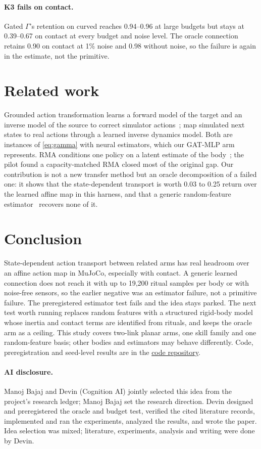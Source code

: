 \documentclass[11pt]{article}
\begin{document}
\paragraph{K3 fails on contact.}
Gated \(\Gamma\)'s retention on curved reaches 0.94--0.96 at large budgets but stays at 0.39--0.67 on contact at every budget and noise level. The oracle connection retains 0.90 on contact at 1\% noise and 0.98 without noise, so the failure is again in the estimate, not the primitive.

\section{Related work}
\label{sec:related}
Grounded action transformation learns a forward model of the target and an inverse model of the source to correct simulator actions~\citep{hanna2017gat}; \citet{christiano2016transfer} map simulated next states to real actions through a learned inverse dynamics model. Both are instances of \cref{eq:gamma} with neural estimators, which our GAT-MLP arm represents. RMA conditions one policy on a latent estimate of the body~\citep{kumar2021rma}; the pilot found a capacity-matched RMA closed most of the original gap. Our contribution is not a new transfer method but an oracle decomposition of a failed one: it shows that the state-dependent transport is worth 0.03 to 0.25 return over the learned affine map in this harness, and that a generic random-feature estimator~\citep{rahimi2007random} recovers none of it.

\section{Conclusion}
\label{sec:conclusion}
State-dependent action transport between related arms has real headroom over an affine action map in MuJoCo, especially with contact. A generic learned connection does not reach it with up to 19{,}200 ritual samples per body or with noise-free sensors, so the earlier negative was an estimator failure, not a primitive failure. The preregistered estimator test fails and the idea stays parked. The next test worth running replaces random features with a structured rigid-body model whose inertia and contact terms are identified from rituals, and keeps the oracle arm as a ceiling. This study covers two-link planar arms, one skill family and one random-feature basis; other bodies and estimators may behave differently. Code, preregistration and seed-level results are in the \href{https://github.com/manojbajaj95/cl/tree/main/experiments/body_connection}{code repository}.

\paragraph{AI disclosure.}
Manoj Bajaj and Devin (Cognition AI) jointly selected this idea from the project's research ledger; Manoj Bajaj set the research direction. Devin designed and preregistered the oracle and budget test, verified the cited literature records, implemented and ran the experiments, analyzed the results, and wrote the paper. Idea selection was mixed; literature, experiments, analysis and writing were done by Devin.



\end{document}
